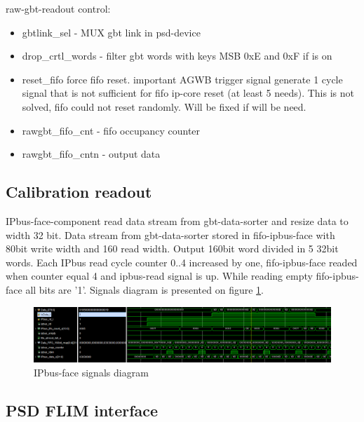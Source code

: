 \documentclass{article}
\begin{document}
raw-gbt-readout control:
\begin{itemize}
\item gbtlink\_sel - MUX gbt link in psd-device
\item drop\_crtl\_words - filter gbt words with keys MSB 0xE and 0xF if is on
\item reset\_fifo force fifo reset. important AGWB trigger signal generate 1 cycle signal that is not sufficient for fifo ip-core reset (at least 5 needs). This is not solved, fifo could not reset randomly. Will be fixed if will be need.
\item rawgbt\_fifo\_cnt - fifo occupancy counter
\item rawgbt\_fifo\_cntn - output data
\end{itemize}


\subsection{Calibration readout}\label{sec:data-rd}
IPbus-face-component read data stream from gbt-data-sorter and resize data to width 32 bit. Data stream from gbt-data-sorter stored in fifo-ipbus-face with 80bit write width and 160 read width. Output 160bit word divided in 5 32bit words. Each IPbus read cycle counter 0..4 increased by one, fifo-ipbus-face readed when counter equal 4 and ipbus-read signal is up. While reading empty fifo-ipbus-face all bits are '1'. Signals diagram is presented on figure \ref{fig:11}.

\begin{figure}[H]
	\centering 
	\includegraphics[width=1.0\textwidth]{ipbus-face-waves.png}
	\caption{\label{fig:11} IPbus-face signals diagram }
\end{figure}



\subsection{PSD FLIM interface}\label{sec:flim-iface}



\end{document}
